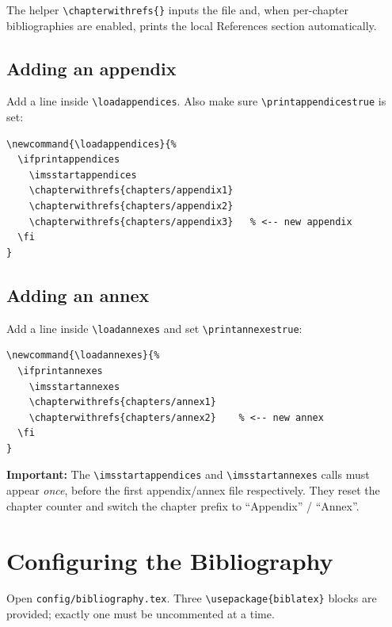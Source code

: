 The helper \texttt{\textbackslash chapterwithrefs\{\}} inputs the file and,
when per-chapter bibliographies are enabled, prints the local References
section automatically.

\subsection{Adding an appendix} \label{sec:addappendix}

Add a line inside \texttt{\textbackslash loadappendices}.  Also make sure
\texttt{\textbackslash printappendicestrue} is set:

\begin{verbatim}
\newcommand{\loadappendices}{%
  \ifprintappendices
    \imsstartappendices
    \chapterwithrefs{chapters/appendix1}
    \chapterwithrefs{chapters/appendix2}
    \chapterwithrefs{chapters/appendix3}   % <-- new appendix
  \fi
}
\end{verbatim}

\subsection{Adding an annex} \label{sec:addannex}

Add a line inside \texttt{\textbackslash loadannexes} and set
\texttt{\textbackslash printannexestrue}:

\begin{verbatim}
\newcommand{\loadannexes}{%
  \ifprintannexes
    \imsstartannexes
    \chapterwithrefs{chapters/annex1}
    \chapterwithrefs{chapters/annex2}    % <-- new annex
  \fi
}
\end{verbatim}

\textbf{Important:} The \texttt{\textbackslash imsstartappendices} and
\texttt{\textbackslash imsstartannexes} calls must appear \emph{once}, before
the first appendix/annex file respectively.  They reset the chapter counter
and switch the chapter prefix to ``Appendix'' / ``Annex''.

\section{Configuring the Bibliography} \label{sec:bibliography}

Open \texttt{config/bibliography.tex}.  Three \texttt{\textbackslash usepackage\{biblatex\}}
blocks are provided; exactly one must be uncommented at a time.

